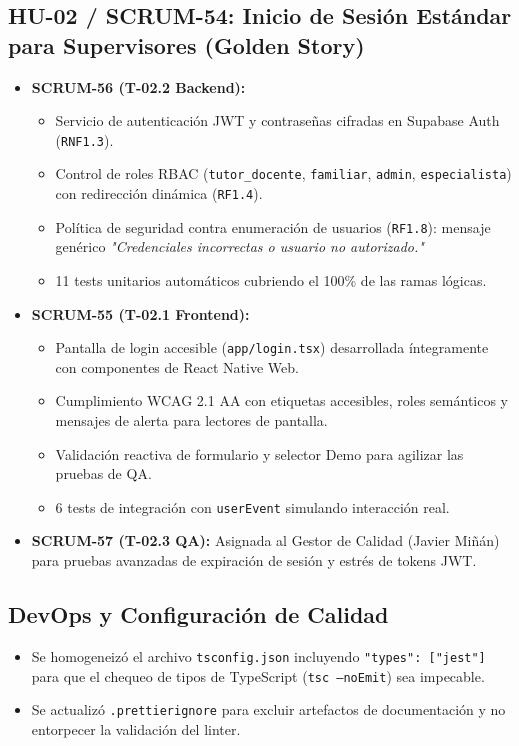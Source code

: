 \documentclass[11pt,a4paper]{article}
\begin{document}
\subsection{HU-02 / SCRUM-54: Inicio de Sesión Estándar para Supervisores (Golden Story)}
\begin{itemize}[leftmargin=*]
    \item \textbf{SCRUM-56 (T-02.2 Backend):}
    \begin{itemize}
        \item Servicio de autenticación JWT y contraseñas cifradas en Supabase Auth (\texttt{RNF1.3}).
        \item Control de roles RBAC (\texttt{tutor\_docente}, \texttt{familiar}, \texttt{admin}, \texttt{especialista}) con redirección dinámica (\texttt{RF1.4}).
        \item Política de seguridad contra enumeración de usuarios (\texttt{RF1.8}): mensaje genérico \textit{"Credenciales incorrectas o usuario no autorizado."}
        \item 11 tests unitarios automáticos cubriendo el 100\% de las ramas lógicas.
    \end{itemize}
    \item \textbf{SCRUM-55 (T-02.1 Frontend):}
    \begin{itemize}
        \item Pantalla de login accesible (\texttt{app/login.tsx}) desarrollada íntegramente con componentes de React Native Web.
        \item Cumplimiento WCAG 2.1 AA con etiquetas accesibles, roles semánticos y mensajes de alerta para lectores de pantalla.
        \item Validación reactiva de formulario y selector Demo para agilizar las pruebas de QA.
        \item 6 tests de integración con \texttt{userEvent} simulando interacción real.
    \end{itemize}
    \item \textbf{SCRUM-57 (T-02.3 QA):} Asignada al Gestor de Calidad (Javier Miñán) para pruebas avanzadas de expiración de sesión y estrés de tokens JWT.
\end{itemize}

\subsection{DevOps y Configuración de Calidad}
\begin{itemize}[leftmargin=*]
    \item Se homogeneizó el archivo \texttt{tsconfig.json} incluyendo \texttt{"types": ["jest"]} para que el chequeo de tipos de TypeScript (\texttt{tsc --noEmit}) sea impecable.
    \item Se actualizó \texttt{.prettierignore} para excluir artefactos de documentación y no entorpecer la validación del linter.
\end{itemize}
\end{document}
